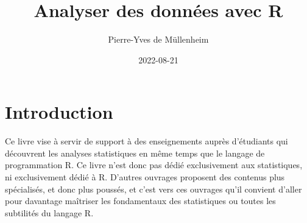 \documentclass[
  french,
]{book}
\title{Analyser des données avec R}
\author{Pierre-Yves de Müllenheim}
\date{2022-08-21}
\begin{document}
\maketitle

\renewcommand*\contentsname{Sommaire}
{
\setcounter{tocdepth}{1}
\tableofcontents
}
\renewcommand{\listfigurename}{Liste des figures}
\renewcommand{\figurename}{Figure}
\renewcommand{\tablename}{Tableau}

\listoftables

\listoffigures

\hypertarget{introduction}{%
\chapter*{Introduction}\label{introduction}}

Ce livre vise à servir de support à des enseignements auprès d'étudiants qui découvrent les analyses statistiques en même temps que le langage de programmation R. Ce livre n'est donc pas dédié exclusivement aux statistiques, ni exclusivement dédié à R. D'autres ouvrages proposent des contenus plus spécialisés, et donc plus poussés, et c'est vers ces ouvrages qu'il convient d'aller pour davantage maîtriser les fondamentaux des statistiques ou toutes les subtilités du langage R.
\end{document}
